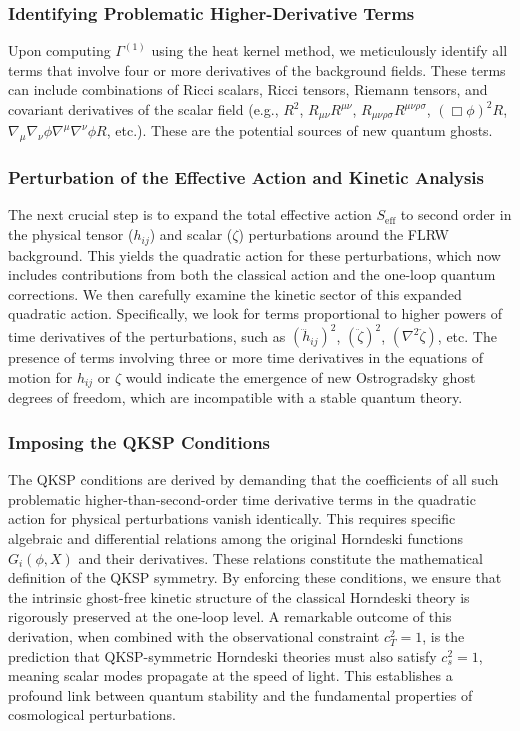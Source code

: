 \documentclass[twocolumn]{aastex631}
\begin{document}
\subsubsection{Identifying Problematic Higher-Derivative Terms}
Upon computing $\Gamma^{(1)}$ using the heat kernel method, we meticulously identify all terms that involve four or more derivatives of the background fields. These terms can include combinations of Ricci scalars, Ricci tensors, Riemann tensors, and covariant derivatives of the scalar field (e.g., $R^2$, $R_{\mu\nu}R^{\mu\nu}$, $R_{\mu\nu\rho\sigma}R^{\mu\nu\rho\sigma}$, $(\Box\phi)^2 R$, $\nabla_\mu\nabla_\nu\phi \nabla^\mu\nabla^\nu\phi R$, etc.). These are the potential sources of new quantum ghosts.

\subsubsection{Perturbation of the Effective Action and Kinetic Analysis}
The next crucial step is to expand the total effective action $S_{\text{eff}}$ to second order in the physical tensor ($h_{ij}$) and scalar ($\zeta$) perturbations around the FLRW background. This yields the quadratic action for these perturbations, which now includes contributions from both the classical action and the one-loop quantum corrections. We then carefully examine the kinetic sector of this expanded quadratic action.
Specifically, we look for terms proportional to higher powers of time derivatives of the perturbations, such as $(\dddot{h}_{ij})^2$, $(\ddot{\zeta})^2$, $(\nabla^2 \ddot{\zeta})$, etc. The presence of terms involving three or more time derivatives in the equations of motion for $h_{ij}$ or $\zeta$ would indicate the emergence of new Ostrogradsky ghost degrees of freedom, which are incompatible with a stable quantum theory.

\subsubsection{Imposing the QKSP Conditions}
The QKSP conditions are derived by demanding that the coefficients of all such problematic higher-than-second-order time derivative terms in the quadratic action for physical perturbations vanish identically. This requires specific algebraic and differential relations among the original Horndeski functions $G_i(\phi, X)$ and their derivatives. These relations constitute the mathematical definition of the QKSP symmetry. By enforcing these conditions, we ensure that the intrinsic ghost-free kinetic structure of the classical Horndeski theory is rigorously preserved at the one-loop level. A remarkable outcome of this derivation, when combined with the observational constraint $c_T^2=1$, is the prediction that QKSP-symmetric Horndeski theories must also satisfy $c_s^2=1$, meaning scalar modes propagate at the speed of light. This establishes a profound link between quantum stability and the fundamental properties of cosmological perturbations.
\end{document}
